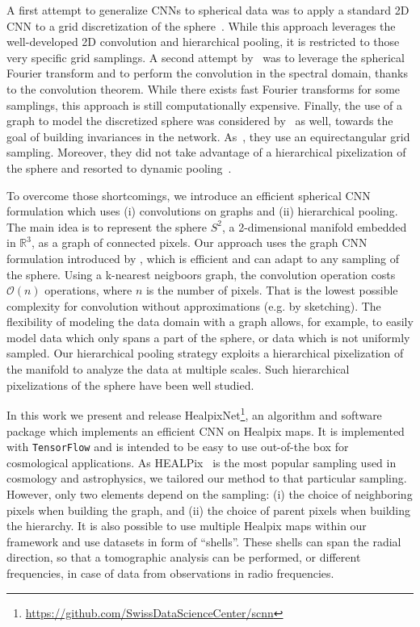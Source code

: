 \documentclass[final,twocolumn,3p,times,authoryear]{elsarticle}
\newcommand{\todo}[1]{{\color[rgb]{.6,.1,.6}{#1}}}
\newcommand{\1}{\b{1}}              %
\newcommand{\0}{\b{0}}              %
\newcommand{\pkg}[1]{\texttt{#1}}
\begin{document}
A first attempt to generalize CNNs to spherical data was to apply a standard 2D CNN to a grid discretization of the sphere~\citep{boomsma2017spherical}. While this approach leverages the well-developed 2D convolution and hierarchical pooling, it is restricted to those very specific grid samplings.
A second attempt by~\citet{cohen2018spherical} was to leverage the spherical Fourier transform and to perform the convolution in the spectral domain, thanks to the convolution theorem. While there exists fast Fourier transforms for some samplings, this approach is still computationally expensive.
Finally, the use of a graph to model the discretized sphere was considered by~\citet{khasanova2017graph} as well, towards the goal of building invariances in the network. As~\citep{boomsma2017spherical}, they use an equirectangular grid sampling. Moreover, they did not take advantage of a hierarchical pixelization of the sphere and resorted to dynamic pooling~\citep{kalchbrenner2014dcnn}.

To overcome those shortcomings, we introduce an efficient spherical CNN formulation which uses (i) convolutions on graphs and (ii) hierarchical pooling. The main idea is to represent the sphere $S^2$, a 2-dimensional manifold embedded in $\mathbb{R}^3$, as a graph of connected pixels.
Our approach uses the graph CNN formulation introduced by \citet{defferrard2016convolutional}, which is efficient and can adapt to any sampling of the sphere. Using a k-nearest neigboors graph, the convolution operation costs $\mathcal{O}(n)$ operations, where $n$ is the number of pixels. That is the lowest possible complexity for convolution without approximations (e.g. by sketching).
The flexibility of modeling the data domain with a graph allows, for example, to easily model data which only spans a part of the sphere, or data which is not uniformly sampled.
Our hierarchical pooling strategy exploits a hierarchical pixelization of the manifold to analyze the data at multiple scales. Such hierarchical pixelizations of the sphere have been well studied.

In this work we present and release HealpixNet\footnote{\url{https://github.com/SwissDataScienceCenter/scnn} \todo{change location}}, an algorithm and software package which implements an efficient CNN on Healpix maps. It is implemented with \pkg{TensorFlow} \citep{abadi2016tensorflow} and is intended to be easy to use out-of-the box for cosmological applications.
As HEALPix~\citep{gorski2005healpix} is the most popular sampling used in cosmology and astrophysics, we tailored our method to that particular sampling. However, only two elements depend on the sampling: (i) the choice of neighboring pixels when building the graph, and (ii) the choice of parent pixels when building the hierarchy.
It is also possible to use multiple Healpix maps within our framework and use datasets in form of ``shells''. These shells can span the radial direction, so that a tomographic analysis can be performed, or different frequencies, in case of data from observations in radio frequencies.
\end{document}
